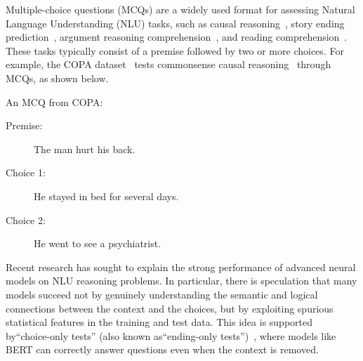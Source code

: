 %
%
%

Multiple-choice questions (MCQs) are a widely used format for assessing Natural Language Understanding (NLU) tasks, such as causal reasoning~\cite{copa2012}, 
story ending prediction~\cite{roc2017,huang20story}, argument reasoning comprehension~\cite{arct2018}, and reading comprehension~\cite{yu2020reclor}. These tasks typically consist of a premise followed by two or more choices. For example, the COPA dataset~\cite{copa2012} tests commonsense causal reasoning~\cite{luo2016commonsense} through MCQs, as shown below.

\begin{example}\label{ex:copa}
An MCQ from COPA:
\begin{description}
\item[Premise:] The man hurt his back.
\item[Choice 1:] He stayed in bed for several days. \Checkmark
\item[Choice 2:] He went to see a psychiatrist. \XSolidBrush
\end{description}
\end{example}

Recent research has sought to explain the strong performance of advanced neural models on NLU reasoning problems. In particular, there is speculation that many models succeed not by genuinely understanding the semantic and logical connections between the context and the choices, but by exploiting spurious statistical features in the training and test data. This idea is supported by``choice-only tests'' (also known as``ending-only tests'')~\cite{endingonly1,endingonly2}, where models like BERT can correctly answer questions even when the context is removed.


